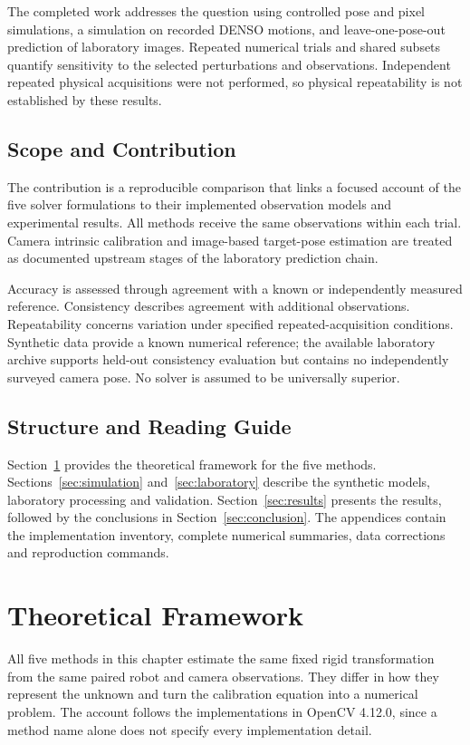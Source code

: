 \documentclass[12pt,a4paper]{article}
\begin{document}
The completed work addresses the question using controlled pose and pixel simulations, a simulation on recorded DENSO motions, and leave-one-pose-out prediction of laboratory images. Repeated numerical trials and shared subsets quantify sensitivity to the selected perturbations and observations. Independent repeated physical acquisitions were not performed, so physical repeatability is not established by these results. \cite{experimentcode,eauncertainty}

\subsection{Scope and Contribution}
The contribution is a reproducible comparison that links a focused account of the five solver formulations to their implemented observation models and experimental results. All methods receive the same observations within each trial. Camera intrinsic calibration and image-based target-pose estimation are treated as documented upstream stages of the laboratory prediction chain. \cite{experimentcode,halconde}

Accuracy is assessed through agreement with a known or independently measured reference. Consistency describes agreement with additional observations. Repeatability concerns variation under specified repeated-acquisition conditions. Synthetic data provide a known numerical reference; the available laboratory archive supports held-out consistency evaluation but contains no independently surveyed camera pose. No solver is assumed to be universally superior. \cite{eauncertainty,experimentcode}

\subsection{Structure and Reading Guide}
Section~\ref{sec:methods} provides the theoretical framework for the five methods. Sections~\ref{sec:simulation} and~\ref{sec:laboratory} describe the synthetic models, laboratory processing and validation. Section~\ref{sec:results} presents the results, followed by the conclusions in Section~\ref{sec:conclusion}. The appendices contain the implementation inventory, complete numerical summaries, data corrections and reproduction commands.

\clearpage
\section{Theoretical Framework}\label{sec:methods}
All five methods in this chapter estimate the same fixed rigid transformation from the same paired robot and camera observations. They differ in how they represent the unknown and turn the calibration equation into a numerical problem. The account follows the implementations in OpenCV 4.12.0, since a method name alone does not specify every implementation detail. \cite{opencv,opencvsource}
\end{document}

